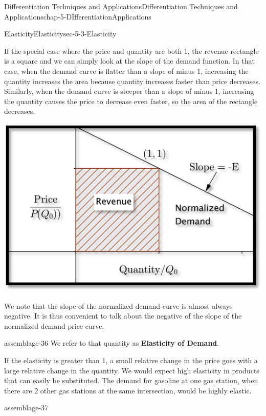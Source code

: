 \documentclass[oneside,10pt,]{book}
\newcommand{\terminology}[1]{\textbf{#1}}
\numberwithin{equation}{section}
\begin{document}
\begin{chapterptx}{Differentiation Techniques and Applications}{}{Differentiation Techniques and Applications}{}{}{chap-5-DIfferentiationApplications}
\begin{sectionptx}{Elasticity}{}{Elasticity}{}{}{sec-5-3-Elasticity}
\par
\hypertarget{p-2026}{}%
If the special case where the price and quantity are both 1, the revenue rectangle is a square and we can simply look at the slope of the demand function. In that case, when the demand curve is flatter than a slope of minus 1, increasing the quantity increases the area because quantity increases faster than price decreases.  Similarly, when the demand curve is steeper than a slope of minus 1, increasing the quantity causes the price to decrease even faster, so the area of the rectangle decreases.%
\begin{sidebyside}{1}{0.2}{0.2}{0}%
\begin{sbspanel}{0.6}%
\includegraphics[width=1\linewidth]{images/sec5-3-2.png}
\end{sbspanel}%
\end{sidebyside}%
\par
\hypertarget{p-2027}{}%
We note that the slope of the normalized demand curve is almost always negative.  It is thus convenient to talk about the negative of the slope of the normalized demand price curve.%
\begin{assemblage}{}{assemblage-36}%
\hypertarget{p-2028}{}%
We refer to that quantity as \terminology{Elasticity of Demand}.%
\end{assemblage}
\hypertarget{p-2029}{}%
If the elasticity is greater than 1, a small relative change in the price goes with a large relative change in the quantity.  We would expect high elasticity in products that can easily be substituted.  The demand for gasoline at one gas station, when there are 2 other gas stations at the same intersection, would be highly elastic.%
\begin{assemblage}{}{assemblage-37}%

\end{assemblage}
\end{sectionptx}
\end{chapterptx}
\end{document}
